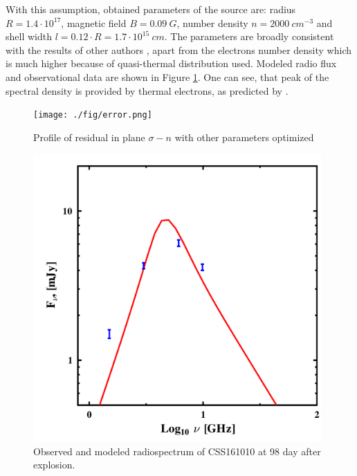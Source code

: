 \documentclass{article}
\begin{document}
	With this assumption, obtained parameters of the source are: radius $R = 1.4\cdot10^{17}$, magnetic field $B = 0.09~G$, number density $n = 2000~{cm}^{-3}$ and shell width $l = 0.12\cdot R = 1.7\cdot10^{15}~cm$. The parameters are broadly consistent with the results of other authors \cite{Coppejans2020}, apart from the electrons number density which is much higher because of quasi-thermal distribution used.  Modeled radio flux and observational data are shown in Figure \ref{synchrotron}. One can see, that peak of the spectral density is provided by thermal electrons, as predicted by \cite{Margalit2021}.
	
	\begin{figure}
		\centering
		\begin{minipage}{0.48\textwidth}
			\centering
			\texttt{[image: ./fig/error.png]} 
			\caption{Profile of residual in plane $\sigma - n$ with other parameters optimized}
			\label{error}
		\end{minipage}\hfill
		\begin{minipage}{0.48\textwidth}
			\centering
			\includegraphics[width=0.98\textwidth]{./fig/radiation2.png} 
			\caption{Observed and modeled radiospectrum of CSS161010 at 98 day after explosion.}
			\label{synchrotron}
		\end{minipage}
	\end{figure}
	
\end{document}
